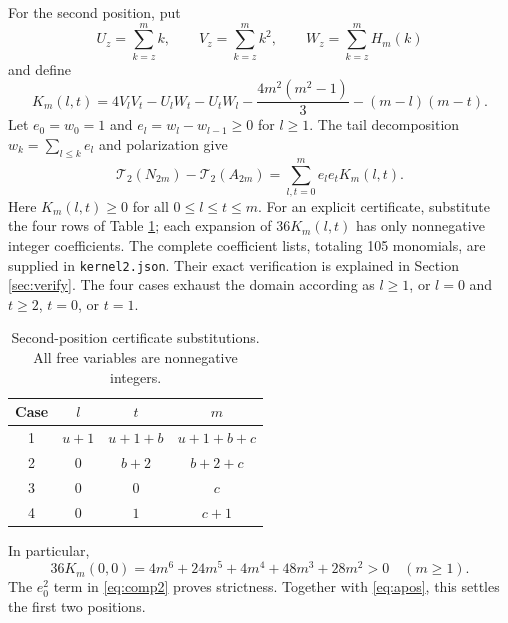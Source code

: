\documentclass[11pt]{article}
\newcommand{\T}{\mathcal T}
\begin{document}
For the second position, put
\[
 U_z=\sum_{k=z}^m k,\qquad V_z=\sum_{k=z}^m k^2,\qquad
 W_z=\sum_{k=z}^m H_m(k)
\]
and define
\begin{equation}\label{eq:k2}
 K_m(l,t)=4V_lV_t-U_lW_t-U_tW_l
 -\frac{4m^2(m^2-1)}3-(m-l)(m-t).
\end{equation}
Let $e_0=w_0=1$ and $e_l=w_l-w_{l-1}\ge0$ for $l\ge1$.
The tail decomposition $w_k=\sum_{l\le k}e_l$ and polarization give
\begin{equation}\label{eq:comp2}
 \T_2(N_{2m})-\T_2(A_{2m})=\sum_{l,t=0}^m e_le_tK_m(l,t).
\end{equation}
Here $K_m(l,t)\ge0$ for all $0\le l\le t\le m$.
For an explicit certificate, substitute the four rows of
Table \ref{tab:k2}; each expansion of $36K_m(l,t)$ has only nonnegative
integer coefficients. The complete coefficient lists, totaling 105
monomials, are supplied in \texttt{kernel2.json}. Their exact verification
is explained in Section \ref{sec:verify}.
The four cases exhaust the domain according as $l\ge1$, or $l=0$ and
$t\ge2$, $t=0$, or $t=1$.
\begin{table}[ht]
\centering
\begin{tabular}{c c c c}
\toprule
Case & $l$ & $t$ & $m$\\\midrule
1 & $u+1$ & $u+1+b$ & $u+1+b+c$\\
2 & $0$ & $b+2$ & $b+2+c$\\
3 & $0$ & $0$ & $c$\\
4 & $0$ & $1$ & $c+1$\\\bottomrule
\end{tabular}
\caption{Second-position certificate substitutions. All free variables are
nonnegative integers.}\label{tab:k2}
\end{table}
In particular,
\[
 36K_m(0,0)=4m^6+24m^5+4m^4+48m^3+28m^2>0\quad(m\ge1).
\]
The $e_0^2$ term in \eqref{eq:comp2} proves strictness. Together with
\eqref{eq:apos}, this settles the first two positions.
\end{document}
